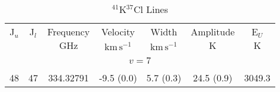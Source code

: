 \begin{table*}[htp]
\centering
\caption{$^{41}$K$^{37}$Cl Lines}
\begin{tabular}{ccccccc}
\label{tab:41K37Cl_salt_lines}
 J$_u$ & J$_l$ & Frequency & Velocity & Width & Amplitude & E$_U$ \\
  &  & $\mathrm{GHz}$ & $\mathrm{km\,s^{-1}}$ & $\mathrm{km\,s^{-1}}$ & $\mathrm{K}$ & $\mathrm{K}$ \\
\hline
&\vspace{-0.75em}\\
\multicolumn{7}{c}{$v = 7$} \\
\vspace{-0.75em}\\
 48 & 47 & 334.32791 & -9.5 (0.0) & 5.7 (0.3) & 24.5 (0.9) & 3049.3 \\
\hline
\end{tabular}

\par 
\end{table*}
